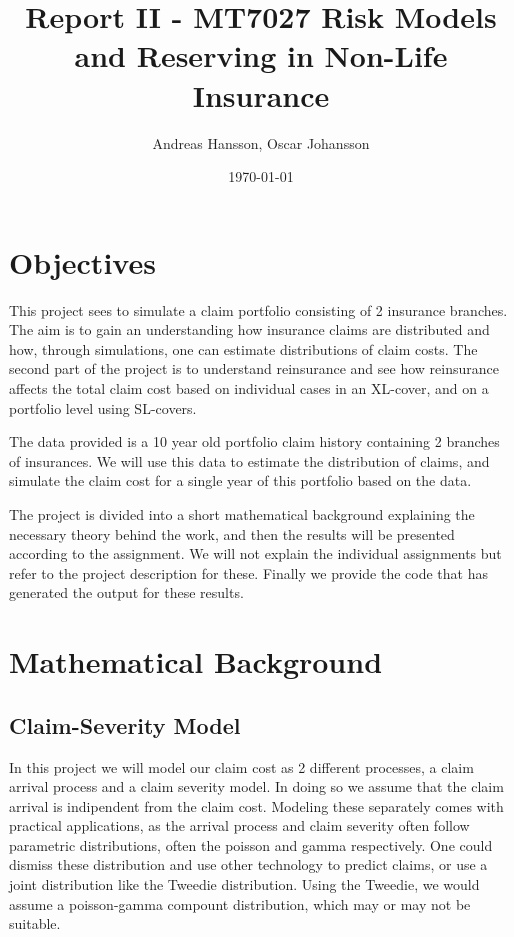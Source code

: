 \documentclass[11pt]{article}
\title{Report II - MT7027 Risk Models and Reserving in Non-Life Insurance}
\author{Andreas Hansson, Oscar Johansson}
\date{\today}
\begin{document}
\maketitle
\section*{Objectives}
This project sees to simulate a claim portfolio consisting of 2 insurance branches.
The aim is to gain an understanding how insurance claims are distributed and how, through simulations, one can estimate distributions of  claim costs.
The second part of the project is to understand reinsurance and see how reinsurance affects the total claim cost based on individual cases in an XL-cover, and on a portfolio level using SL-covers.

The data provided is a 10 year old portfolio claim history containing 2 branches of insurances.
We will use this data to estimate the distribution of claims, and simulate the claim cost for a single year of this portfolio based on the data.

The project is divided into a short mathematical background explaining the necessary theory behind the work, and then the results will be presented according to the assignment.
We will not explain the individual assignments but refer to the project description for these.
Finally we provide the code that has generated the output for these results.

\section*{Mathematical Background}

\subsection{Claim-Severity Model}
In this project we will model our claim cost as 2 different processes, a claim arrival process and a claim severity model.
In doing so we assume that the claim arrival is indipendent from the claim cost.
Modeling these separately comes with practical applications, as the arrival process and claim severity often follow parametric distributions, often the poisson and gamma respectively.
One could dismiss these distribution and use other technology to predict claims, or use a joint distribution like the Tweedie distribution. 
Using the Tweedie, we would assume a poisson-gamma compount distribution, which may or may not be suitable.
\end{document}
